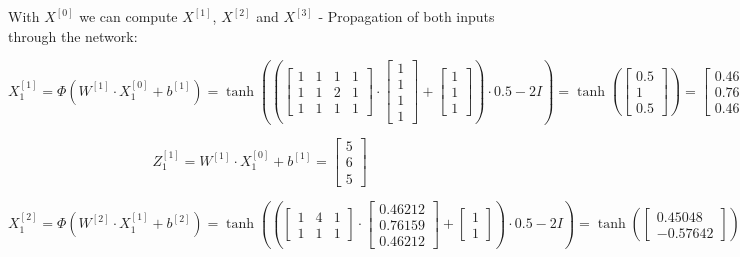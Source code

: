 \documentclass{article}
\begin{document}
With $X^{[0]}$ we can compute $X^{[1]}$, $X^{[2]}$ and $X^{[3]}$ - Propagation of both inputs through the network:

\[ X^{[1]}_1 = \Phi(W^{[1]} \cdot X^{[0]}_1 + b^{[1]}) = \tanh \left( \left(\begin{bmatrix} 1 & 1 & 1 & 1 \\ 1 & 1 & 2 & 1 \\ 1 & 1 & 1 & 1 \end{bmatrix} \cdot \begin{bmatrix} 1 \\ 1 \\ 1 \\ 1 \end{bmatrix} + \begin{bmatrix} 1 \\ 1 \\ 1 \end{bmatrix} \right) \cdot 0.5 - 2I \right) = \tanh \left( \begin{bmatrix} 0.5 \\ 1 \\ 0.5 \end{bmatrix} \right)  = \begin{bmatrix} 0.46212 \\ 0.76159 \\ 0.46212 \end{bmatrix} \]

\[ Z^{[1]}_1 = W^{[1]} \cdot X^{[0]}_1 + b^{[1]} = \begin{bmatrix} 5 \\ 6 \\ 5 \end{bmatrix} \]

\[ X^{[2]}_1 = \Phi(W^{[2]} \cdot X^{[1]}_1 + b^{[2]}) = \tanh \left( \left(\begin{bmatrix} 1 & 4 & 1 \\ 1 & 1 & 1 \end{bmatrix} \cdot \begin{bmatrix} 0.46212 \\ 0.76159 \\ 0.46212 \end{bmatrix} + \begin{bmatrix} 1 \\ 1 \end{bmatrix} \right) \cdot 0.5 - 2I \right) = \tanh \left( \begin{bmatrix} 0.45048 \\ -0.57642 \end{bmatrix} \right)  = \begin{bmatrix} 0.45048 \\ -0.57642 \end{bmatrix} \]
\end{document}
